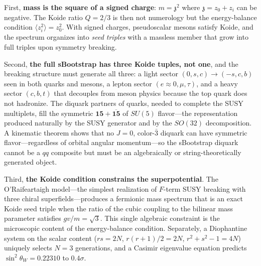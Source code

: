 \documentclass[12pt,a4paper]{article}
\newcommand{\zch}{\mathfrak{z}}
\begin{document}
First, \textbf{mass is the square of a signed charge}: $m = \zch^2$ 
where $\zch = z_0 + z_i$ can be negative. The Koide ratio $Q = 2/3$ 
is then not numerology but the energy-balance condition 
$\langle z_i^2\rangle = z_0^2$. With signed charges, pseudoscalar 
mesons satisfy Koide, and the spectrum organizes into \emph{seed 
triples} with a massless member that grow into full triples upon 
symmetry breaking.

Second, \textbf{the full sBootstrap has three Koide tuples, not one}, 
and the breaking structure must generate all three: a light sector 
$(0,s,c) \to (-s,c,b)$ seen in both quarks and mesons, a lepton 
sector $(e\!\approx\!0, \mu, \tau)$, and a heavy sector $(c,b,t)$ 
that decouples from meson physics because the top quark does not 
hadronize. The diquark partners of quarks, needed to complete the 
SUSY multiplets, fill the symmetric $\mathbf{15} + \overline{\mathbf{15}}$ 
of $SU(5)$ flavor---the representation produced naturally by the 
SUSY generator and by the $SO(32)$ decomposition. A kinematic 
theorem shows that no $J=0$, color-$\bar{3}$ diquark can have 
symmetric flavor---regardless of orbital angular momentum---so the 
sBootstrap diquark cannot be a $qq$ composite but must be an
algebraically or string-theoretically generated object.

Third, \textbf{the Koide condition constrains the superpotential}.
The O'Raifeartaigh model---the simplest realization of $F$-term
SUSY breaking with three chiral superfields---produces a fermionic
mass spectrum that is an exact Koide seed triple when the ratio of
the cubic coupling to the bilinear mass parameter satisfies
$gv/m = \sqrt{3}$. This single algebraic constraint is the
microscopic content of the energy-balance condition. Separately,
a Diophantine system on the scalar content ($rs = 2N$,
$r(r+1)/2 = 2N$, $r^2+s^2-1=4N$) uniquely selects $N=3$
generations, and a Casimir eigenvalue equation predicts
$\sin^2\theta_W = 0.22310$ to $0.4\sigma$.
\end{document}
